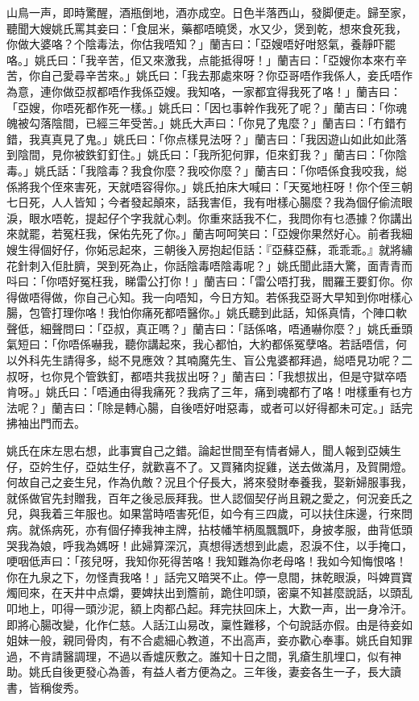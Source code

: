 \documentclass[a5paper, 12pt, openany]{book} %
\begin{document}
	山鳥一声，即時驚醒，酒瓶倒地，酒亦成空。日色半落西山，發脚便走。歸至家，聽聞大嫂姚氏罵其妾曰：「食屈米，藥都唔曉煲，水又少，煲到乾，想來食死我，你做大婆咯？个陰毒法，你估我唔知？」蘭吉曰：「亞嫂唔好咁怒氣，養靜吓罷咯。」姚氏曰：「我辛苦，佢又來激我，点能抵得呀！」蘭吉曰：「亞嫂你本來冇辛苦，你自己愛尋辛苦來。」姚氏曰：「我去那處來呀？你亞哥唔作我係人，妾氏唔作為意，連你做亞叔都唔作我係亞嫂。我知咯，一家都宜得我死了咯！」蘭吉曰：「亞嫂，你唔死都作死一樣。」姚氏曰：「因乜事幹作我死了呢？」蘭吉曰：「你魂魄被勾落陰間，已經三年受苦。」姚氏大声曰：「你見了鬼麼？」蘭吉曰：「冇錯冇錯，我真真見了鬼。」姚氏曰：「你点樣見法呀？」蘭吉曰：「我因遊山如此如此落到陰間，見你被鉄釘釘住。」姚氏曰：「我所犯何罪，佢來釘我？」蘭吉曰：「你陰毒。」姚氏話：「我陰毒？我食你麼？我咬你麼？」蘭吉曰：「你唔係食我咬我，縂係將我个侄來害死，天就唔容得你。」姚氏拍床大喊曰：「天冤地枉呀！你个侄三朝七日死，人人皆知；今者發起顛來，話我害佢，我有咁樣心腸麼？我為個仔偷流眼淚，眼水唔乾，提起仔个字我就心刺。你重來話我不仁，我問你有乜憑據？你講出來就罷，若冤枉我，保佑先死了你。」蘭吉呵呵笑曰：「亞嫂你果然好心。前者我細嫂生得個好仔，你妬忌起來，三朝後入房抱起佢話：『亞蘇亞蘇，乖乖乖。』就將繡花針刺入佢肚臍，哭到死為止，你話陰毒唔陰毒呢？」姚氏聞此語大驚，面青青而呌曰：「你唔好冤枉我，睇雷公打你！」蘭吉曰：「雷公唔打我，閻羅王要釘你。你得做唔得做，你自己心知。我一向唔知，今日方知。若係我亞哥大早知到你咁樣心腸，包管打理你咯！我怕你痛死都唔醫你。」姚氏聽到此話，知係真情，个陣口軟聲低，細聲問曰：「亞叔，真正嗎？」蘭吉曰：「話係咯，唔通嚇你麼？」姚氏垂頭氣短曰：「你唔係嚇我，聽你講起來，我心都怕，大約都係冤孽咯。若話唔信，何以外科先生請得多，縂不見應效？其喃魔先生、盲公鬼婆都拜過，縂唔見功呢？二叔呀，乜你見个管鉄釘，都唔共我拔出呀？」蘭吉曰：「我想拔出，但是守獄卒唔肯呀。」姚氏曰：「唔通由得我痛死？我病了三年，痛到魂都冇了咯！咁樣重有乜方法呢？」蘭吉曰：「除是轉心腸，自後唔好咁惡毒，或者可以好得都未可定。」話完拂袖出門而去。

	姚氏在床左思右想，此事實自己之錯。論起世間至有情者婦人，聞人報到亞姨生仔，亞妗生仔，亞姑生仔，就歡喜不了。又買豬肉捉雞，送去做滿月，及賀開燈。何故自己之妾生兒，作為仇敵？況且个仔長大，將來發財奉養我，娶新婦服事我，就係做官先封贈我，百年之後忌辰拜我。世人認個契仔尚且親之愛之，何況妾氏之兒，與我着三年服也。如果當時唔害死佢，如今有三四歲，可以扶住床邊，行來問病。就係病死，亦有個仔捧我神主牌，拈枝幡竿柄風飄飄吓，身披孝服，曲背低頭哭我為娘，呼我為媽呀！此婦算深沉，真想得透想到此處，忍淚不住，以手掩口，哽咽低声曰：「孩兒呀，我知你死得苦咯！我知難為你老母咯！我如今知悔恨咯！你在九泉之下，勿怪責我咯！」話完又暗哭不止。停一息間，抹乾眼淚，呌婢買寶燭囘來，在天井中点爝，要婢扶出到簷前，跪住叩頭，密稟不知甚麼說話，以頭乱叩地上，叩得一頭沙泥，額上肉都凸起。拜完扶回床上，大歎一声，出一身冷汗。即將心腸改變，化作仁慈。人話江山易改，稟性難移，个句說話亦假。由是待妾如姐妹一般，親同骨肉，有不合處細心教道，不出高声，妾亦歡心奉事。姚氏自知罪過，不肯請醫調理，不過以香爐灰敷之。誰知十日之間，乳瘡生肌埋口，似有神助。姚氏自後更發心為善，有益人者方便為之。三年後，妻妾各生一子，長大讀書，皆稱俊秀。
\end{document}
